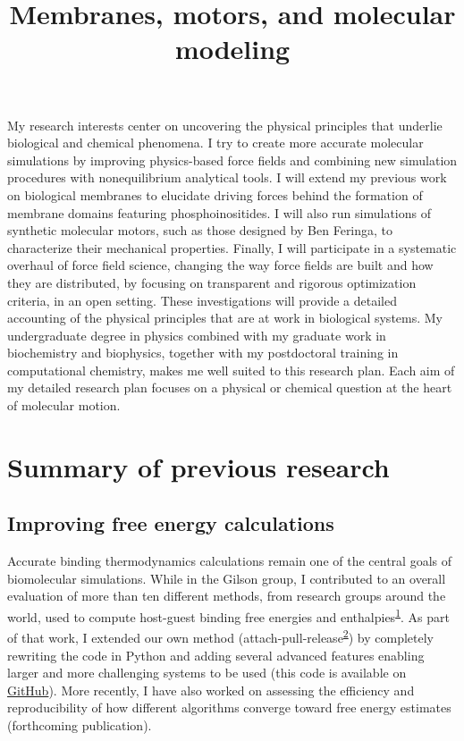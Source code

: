 \documentclass[11pt,notitlepage]{article}
\title{\large \vspace{-0.75in} \textbf{Membranes, motors, and molecular modeling} \vspace{-1in} }
\date{}
\begin{document}

\maketitle
\thispagestyle{title}


My research interests center on uncovering the physical principles that
underlie biological and chemical phenomena. I try to create more
accurate molecular simulations by improving physics-based force fields
and combining new simulation procedures with nonequilibrium analytical
tools. I will extend my previous work on biological membranes to
elucidate driving forces behind the formation of membrane domains
featuring phosphoinositides. I will also run simulations of synthetic
molecular motors, such as those designed by Ben Feringa, to characterize
their mechanical properties. Finally, I will participate in a systematic
overhaul of force field science, changing the way force fields are built
and how they are distributed, by focusing on transparent and rigorous
optimization criteria, in an open setting. These investigations will
provide a detailed accounting of the physical principles that are at
work in biological systems. My undergraduate degree in physics combined
with my graduate work in biochemistry and biophysics, together with my
postdoctoral training in computational chemistry, makes me well suited
to this research plan. Each aim of my detailed research plan focuses on
a physical or chemical question at the heart of molecular motion.

\hypertarget{summary-of-previous-research}{%
\section{Summary of previous
research}\label{summary-of-previous-research}}

\hypertarget{improving-free-energy-calculations}{%
\subsection{Improving free energy
calculations}\label{improving-free-energy-calculations}}

Accurate binding thermodynamics calculations remain one of the central
goals of biomolecular simulations. While in the Gilson group, I
contributed to an overall evaluation of more than ten different methods,
from research groups around the world, used to compute host-guest
binding free energies and
enthalpies\textsuperscript{\protect\hyperlink{ref-BGsUYQln}{1}}. As part
of that work, I extended our own method
(attach-pull-release\textsuperscript{\protect\hyperlink{ref-uzHaEv9Z}{2}})
by completely rewriting the code in Python and adding several advanced
features enabling larger and more challenging systems to be used (this
code is available on
\href{https://www.github.com/slochower/pAPRika}{GitHub}). More recently,
I have also worked on assessing the efficiency and reproducibility of
how different algorithms converge toward free energy estimates
(forthcoming publication).
\end{document}
